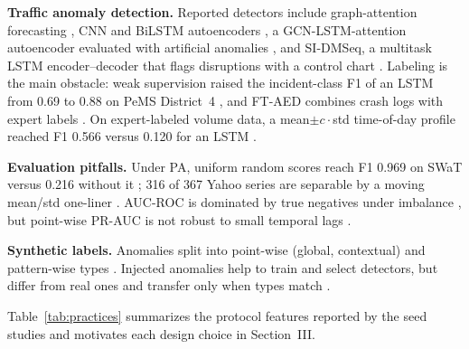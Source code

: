 \documentclass[conference]{IEEEtran}
\begin{document}
\textbf{Traffic anomaly detection.} Reported detectors include
graph-attention forecasting \cite{zhang2022automatic}, CNN and BiLSTM
autoencoders \cite{mendez2022using}, a GCN-LSTM-attention autoencoder
evaluated with artificial anomalies \cite{ijaradar2025datadriven}, and
SI-DMSeq, a multitask LSTM encoder--decoder that flags disruptions with a
control chart \cite{nouri2025sidmseq}. Labeling is the main obstacle: weak
supervision raised the incident-class F1 of an LSTM from 0.69 to 0.88 on
PeMS District~4 \cite{sun2022datacentric}, and FT-AED combines crash logs
with expert labels \cite{coursey2024ftaed}. On expert-labeled volume data, a
mean$\pm c\cdot$std time-of-day profile reached F1 0.566 versus 0.120 for an
LSTM \cite{taheri2026applicability}.

\textbf{Evaluation pitfalls.} Under PA, uniform random scores reach
F1 0.969 on SWaT versus 0.216 without it \cite{kim2022rigorous}; 316 of 367
Yahoo series are separable by a moving mean/std one-liner
\cite{wu2022flawed}. AUC-ROC is dominated by true negatives under imbalance
\cite{sorbo2024navigating,liu2024elephant}, but point-wise PR-AUC is not
robust to small temporal lags \cite{liu2024elephant}.

\textbf{Synthetic labels.} Anomalies split into point-wise (global,
contextual) and pattern-wise types \cite{lai2021revisiting}. Injected
anomalies help to train and select detectors, but differ from real ones and
transfer only when types match \cite{carmona2022ncad,goswami2023unsupervised}.

Table~\ref{tab:practices} summarizes the protocol features reported by the
seed studies and motivates each design choice in Section~III.
\end{document}

